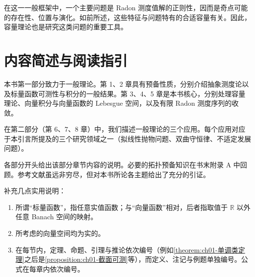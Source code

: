 \documentclass[../main.tex]{subfiles}
\begin{document}
在这一一般框架中，一个主要问题是 Radon 测度值解的正则性，因而是奇点可能的存在性、位置与演化。如前所述，这些特征与问题特有的合适容量有关。因此，容量理论也是研究这类问题的重要工具。

\section*{内容简述与阅读指引}\label{section:intro-guide}

本书第一部分致力于一般理论。第 1、2 章具有预备性质，分别介绍抽象测度论以及标量函数可测性与积分的一般结果。第 3、4、5 章是本书核心，分别处理容量理论、向量积分与向量函数的 Lebesgue 空间，以及有限 Radon 测度序列的收敛。

在第二部分（第 6、7、8 章）中，我们描述一般理论的三个应用。每个应用对应于本引言所提及的三个研究领域之一（拟线性抛物问题、双曲守恒律、不适定发展问题）。

各部分开头给出该部分章节内容的说明。必要的拓扑预备知识在书末附录 A 中回顾。参考文献虽远非穷尽，但对本书所论各主题给出了充分的引证。

补充几点实用说明：
\begin{enumerate}[1.]
\item 所谓“标量函数”，指任意实值函数；与“向量函数”相对，后者指取值于 $\mathbb{R}$ 以外任意 Banach 空间的映射。
\item 所考虑的向量空间均为实的。
\item 在每节内，定理、命题、引理与推论依次编号（例如\cref{theorem:ch01-单调类定理}之后是\cref{proposition:ch01-截面可测}等），而定义、注记与例题单独编号。公式在每章内依次编号。
\end{enumerate}
\end{document}
